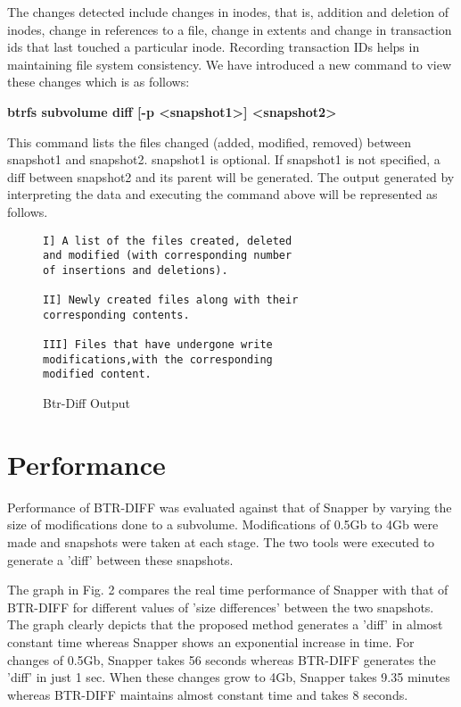 \documentclass[final]{ols}
\begin{document}
The changes detected include changes in inodes, that is, addition and deletion of inodes, change in references to a file, change in extents and change in transaction ids that last touched a particular inode. Recording transaction IDs helps in maintaining file system consistency. We have introduced a new command to view these changes which is as follows:

\textbf{btrfs subvolume diff [-p <snapshot1>] <snapshot2>}

This command lists the files changed (added, modified, removed) between snapshot1 and snapshot2. snapshot1 is optional. If snapshot1 is not specified, a diff between snapshot2 and its parent will be generated. The output generated by interpreting the data and executing the command above will be represented as follows.

\begin{figure}[htb]
\begin{shaded}
\begin{small}
\begin{verbatim}
I] A list of the files created, deleted 
and modified (with corresponding number 
of insertions and deletions).

II] Newly created files along with their 
corresponding contents.

III] Files that have undergone write 
modifications,with the corresponding 
modified content.
\end{verbatim}
\end{small}
\caption{Btr-Diff Output}
\label{lockhart-list-ex}
\end{shaded}
\end{figure}

\section{Performance}\label{lockhart-Performance}
Performance of BTR-DIFF was evaluated against that of Snapper by varying the size of modifications done to a subvolume. Modifications of 0.5Gb to 4Gb were made and snapshots were taken at each stage. The two tools were executed to generate a 'diff' between these snapshots.

The graph in Fig. 2 compares the real time performance of Snapper with that of BTR-DIFF for different values of 'size differences' between the two snapshots. The graph clearly depicts that the proposed method generates a 'diff' in almost constant time whereas Snapper shows an exponential increase in time. For changes of 0.5Gb, Snapper takes 56 seconds whereas BTR-DIFF generates the 'diff' in just 1 sec. When these changes grow to 4Gb, Snapper takes 9.35 minutes whereas BTR-DIFF maintains almost constant time and takes 8 seconds.  
\end{document}
